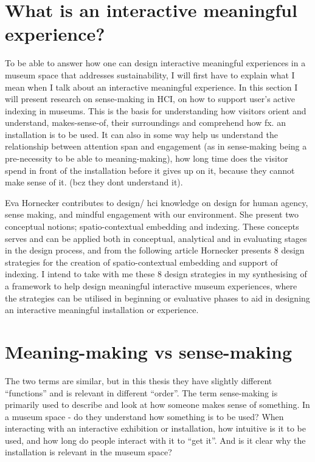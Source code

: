 \section{What is an interactive meaningful experience?}

To be able to answer how one can design interactive meaningful experiences in a museum space that addresses sustainability, I will first have to explain what I mean when I talk about an interactive meaningful experience. In this section I will present research on sense-making in HCI, on how to support user’s active indexing in museums. This is the basis for understanding how visitors orient and understand, makes-sense-of, their surroundings and comprehend how fx. an installation is to be used. It can also in some way help us understand the relationship between attention span and engagement (as in sense-making being a pre-necessity to be able to meaning-making), how long time does the visitor spend in front of the installation before it gives up on it, because they cannot make sense of it. (bcz they dont understand it).

Eva Hornecker contributes to design/ hci knowledge on design for human agency, sense making, and mindful engagement with our environment. She present two conceptual notions; spatio-contextual embedding and indexing. These concepts serves and can be applied both in conceptual, analytical and in evaluating stages in the design process, and from the following article Hornecker presents 8 design strategies for the creation of spatio-contextual embedding and support of indexing. I intend to take with me these 8 design strategies in my synthesising of a framework to help design meaningful interactive museum experiences, where the strategies can be utilised in beginning or evaluative phases to aid in designing an interactive meaningful installation or experience.

\section{Meaning-making vs sense-making}
The two terms are similar, but in this thesis they have slightly different “functions” and is relevant in different “order”. The term sense-making is primarily used to describe and look at how someone makes sense of something. In a museum space - do they understand how something is to be used? When interacting with an interactive exhibition or installation, how intuitive is it to be used, and how long do people interact with it to “get it”. And is it clear why the installation is relevant in the museum space?

